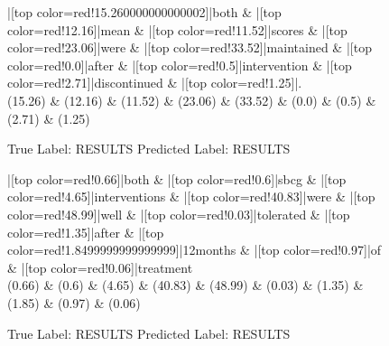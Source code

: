\documentclass[a4paper, landscape]{article}
\begin{document}
\begin{figure}
\begin{center}
\begin{dependency}
\begin{deptext}
|[top color=red!15.260000000000002]|both \& |[top color=red!12.16]|mean \& |[top color=red!11.52]|scores \& |[top color=red!23.06]|were \& |[top color=red!33.52]|maintained \& |[top color=red!0.0]|after \& |[top color=red!0.5]|intervention \& |[top color=red!2.71]|discontinued \& |[top color=red!1.25]|.\\
(15.26) \& (12.16) \& (11.52) \& (23.06) \& (33.52) \& (0.0) \& (0.5) \& (2.71) \& (1.25)\\
\end{deptext}
\end{dependency}
\end{center}
\caption{True Label: RESULTS Predicted Label: RESULTS}
\end{figure}
\clearpage
\begin{figure}
\begin{center}
\begin{dependency}
\begin{deptext}
|[top color=red!0.66]|both \& |[top color=red!0.6]|sbcg \& |[top color=red!4.65]|interventions \& |[top color=red!40.83]|were \& |[top color=red!48.99]|well \& |[top color=red!0.03]|tolerated \& |[top color=red!1.35]|after \& |[top color=red!1.8499999999999999]|12months \& |[top color=red!0.97]|of \& |[top color=red!0.06]|treatment\\
(0.66) \& (0.6) \& (4.65) \& (40.83) \& (48.99) \& (0.03) \& (1.35) \& (1.85) \& (0.97) \& (0.06)\\
\end{deptext}
\end{dependency}
\end{center}
\caption{True Label: RESULTS Predicted Label: RESULTS}
\end{figure}
\clearpage
\end{document}
